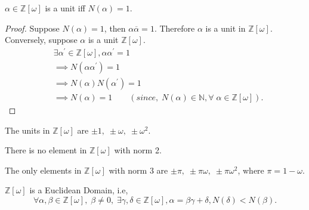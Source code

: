\documentclass[10pt,a4paper]{article}
\begin{document}
\begin{proposition}
$\alpha \in \mathbb{Z}[\omega]$ is a unit iff $N(\alpha) = 1$.
\end{proposition}

\begin{proof}
Suppose $N(\alpha) = 1$, then ${\alpha}\overline{\alpha} = 1$. Therefore $\alpha$ is a unit in $\mathbb{Z}[\omega]$. \\
Conversely, suppose $\alpha$ is a unit $\mathbb{Z}[\omega]$.
\begin{align*}
&\exists {\alpha}^{\prime} \in \mathbb{Z}[\omega], \alpha{\alpha}^{\prime} = 1 \\
&\implies N(\alpha{\alpha}^{\prime}) = 1 \\
&\implies N(\alpha)N({\alpha}^{\prime}) = 1 \\
&\implies N(\alpha)= 1 \qquad(since,\; N(\alpha) \in \mathbb{N}, \forall\; \alpha \in \mathbb{Z}[\omega]).
\end{align*}
\end{proof}

\begin{theorem}
The units in $\mathbb{Z}[\omega]$ are $\pm 1,\;\pm \omega,\;\pm {\omega}^{2}$.
\end{theorem}

\begin{theorem}
There is no element in $\mathbb{Z}[\omega]$ with norm 2.
\end{theorem}

\begin{theorem}
The only elements in $\mathbb{Z}[\omega]$ with norm 3 are $\pm \pi,\;\pm \pi\omega,\;\pm \pi{\omega}^{2}$, where $\pi = 1-\omega$.
\end{theorem}

\begin{theorem}
$\mathbb{Z}[\omega]$ is a Euclidean Domain, i.e, $$\forall \alpha, \beta \in \mathbb{Z}[\omega],\;\beta\neq 0,\;\exists \gamma,\delta \in \mathbb{Z}[\omega],\alpha=\beta\gamma+\delta, N(\delta)<N(\beta).$$
\end{theorem}
\end{document}
